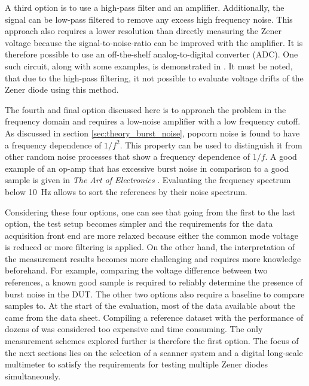 A third option is to use a high-pass filter and an amplifier. Additionally, the signal can be low-pass filtered to remove any excess high frequency noise. This approach also requires a lower resolution than directly measuring the Zener voltage because the signal-to-noise-ratio can be improved with the amplifier. It is therefore possible to use an off-the-shelf analog-to-digital converter (ADC). One such circuit, along with some examples, is demonstrated in \cite{technote_ti_popcorn_noise,kay2012operational}. It must be noted, that due to the high-pass filtering, it not possible to evaluate voltage drifts of the Zener diode using this method.

The fourth and final option discussed here is to approach the problem in the frequency domain and requires a low-noise amplifier with a low frequency cutoff. As discussed in section \ref{sec:theory_burst_noise}, popcorn noise is found to have a frequency dependence of $1/f^2$. This property can be used to distinguish it from other random noise processes that show a frequency dependence of $1/f$. A good example of an op-amp that has excessive burst noise in comparison to a good sample is given in \textit{The Art of Electronics} \citep[p. 478]{horowitz1989}. Evaluating the frequency spectrum below \qty{10}{\Hz} allows to sort the references by their noise spectrum.

Considering these four options, one can see that going from the first to the last option, the test setup becomes simpler and the requirements for the data acquisition front end are more relaxed because either the common mode voltage is reduced or more filtering is applied. On the other hand, the interpretation of the measurement results becomes more challenging and requires more knowledge beforehand. For example, comparing the voltage difference between two references, a known good sample is required to reliably determine the presence of burst noise in the DUT. The other two options also require a baseline to compare samples to. At the start of the evaluation, most of the data available about the  came from the data sheet. Compiling a reference dataset with the performance of dozens of  was considered too expensive and time consuming. The only measurement schemes explored further is therefore the first option. The focus of the next sections lies on the selection of a scanner system and a digital long-scale multimeter to satisfy the requirements for testing multiple  Zener diodes simultaneously.

